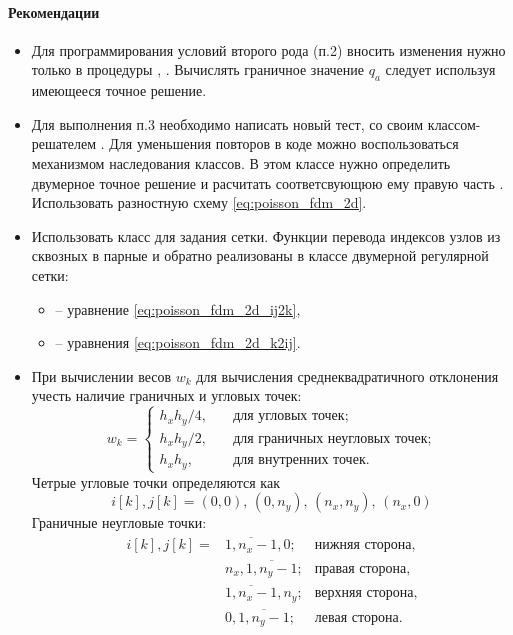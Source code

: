 \paragraph{Рекомендации}
\begin{itemize}
\item
Для программирования условий второго рода (п.2) вносить изменения нужно только в процедуры , 
. Вычислять граничное значение $q_a$ следует используя имеющееся точное решение.

\item
Для выполнения п.3 необходимо написать новый тест, со своим классом-решателем .
Для уменьшения повторов в коде можно воспользоваться механизмом наследования классов.
В этом классе нужно определить двумерное точное решение  и расчитать соответсвующюю ему правую часть .
Использовать разностную схему \cref{eq:poisson_fdm_2d}.

\item
Использовать класс  для задания сетки.
Функции перевода индексов узлов из сквозных в парные и обратно реализованы в классе двумерной регулярной сетки:
\begin{itemize}
\item {} -- уравнение \cref{eq:poisson_fdm_2d_ij2k},
\item {}  -- уравнения \cref{eq:poisson_fdm_2d_k2ij}.
\end{itemize}

\item
При вычислении весов $w_k$ для вычисления среднеквадратичного отклонения учесть
наличие граничных и угловых точек:
\begin{equation*}
    w_k = \begin{cases}
            h_x h_y / 4,  &\quad  \text{для угловых точек};\\
            h_x h_y / 2,  &\quad  \text{для граничных неугловых точек};\\
            h_x h_y,      &\quad  \text{для внутренних точек}.
    \end{cases}
\end{equation*}
Четрые угловые точки определяются как
\begin{equation*}
    i[k], j[k] = (0, 0), \, (0, n_y), \, (n_x, n_y), \, (n_x, 0)
\end{equation*}
Граничные неугловые точки:
\begin{equation*}
    \begin{array}{lll}
        i[k], j[k] =& \overline{1,n_x-1}, 0;    & \text{нижняя сторона},\\
                    & n_x, \overline{1,n_y-1};  & \text{правая сторона},\\
                    & \overline{1, n_x-1}, n_y; & \text{верхняя сторона},\\
                    & 0, \overline{1,n_y-1};    & \text{левая сторона}.
    \end{array}
\end{equation*}


\end{itemize}
